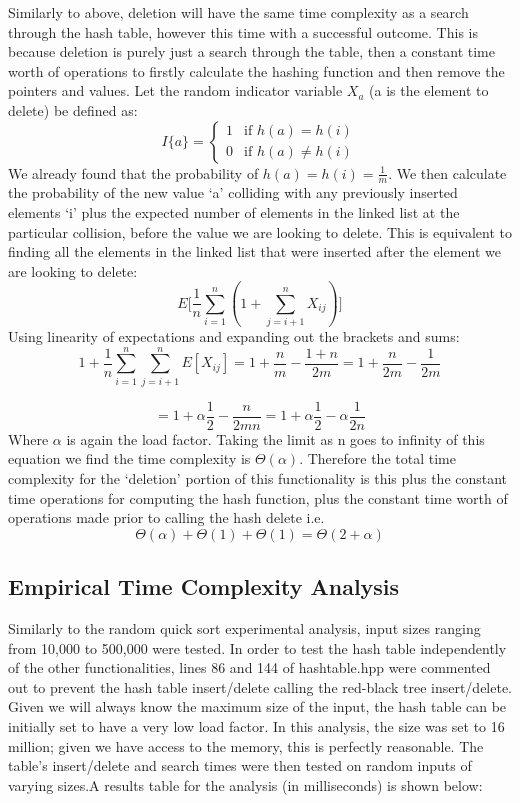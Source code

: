 \documentclass[11p]{article}
\def\nl{\newline}
\begin{document}
Similarly to above, deletion will have the same time complexity as a search through the hash table, however this time with a successful outcome. This is because deletion is purely just a search through the table, then a constant time worth of operations to firstly calculate the hashing function and then remove the pointers and values. \nl
Let the random indicator variable $X_a$ (a is the element to delete) be defined as:
\begin{equation*}
    I\{a \}=
    \begin{cases}
    1 & \text{if } h(a) = h(i) \\
    0 & \text{if } h(a) \ne h(i)
    \end{cases}
\end{equation*}
We already found that the probability of $h(a) = h(i) = \frac{1}{m}$. We then calculate the probability of the new value `a' colliding with any previously inserted elements `i' plus the expected number of elements in the linked list at the particular collision, before the value we are looking to delete. This is equivalent to finding all the elements in the linked list that were inserted after the element we are looking to delete: 
$$E\big[\frac{1}{n} \sum_{i=1}^n (1 + \sum_{j = i+1}^n X_{ij}) \big]$$
Using linearity of expectations and expanding out the brackets and sums:
$$ 1 + \frac{1}{n} \sum_{i=1}^n \sum_{j = i+1}^n E[X_{ij}] = 1 + \frac{n}{m} - \frac{1 + n}{2m} = 1 + \frac{n}{2m} - \frac{1}{2m}$$

$$ = 1 + \alpha \frac{1}{2} - \frac{n}{2mn} = 1 + \alpha \frac{1}{2} - \alpha \frac{1}{2n}$$
Where $\alpha$ is again the load factor. Taking the limit as n goes to infinity of this equation we find the time complexity is $\Theta({\alpha})$. Therefore the total time complexity for the `deletion' portion of this functionality is this plus the constant time operations for computing the hash function, plus the constant time worth of operations made prior to calling the hash delete i.e.
$$\Theta(\alpha) + \Theta(1) + \Theta(1)= \Theta(2 + \alpha)$$

\pagebreak

\subsection{Empirical Time Complexity Analysis}
Similarly to the random quick sort experimental analysis, input sizes ranging from 10,000 to 500,000 were tested. In order to test the hash table independently of the other functionalities, lines 86 and 144 of hashtable.hpp were commented out to prevent the hash table insert/delete calling the red-black tree insert/delete. Given we will always know the maximum size of the input, the hash table can be initially set to have a very low load factor. In this analysis, the size was set to 16 million; given we have access to the memory, this is perfectly reasonable. The table's insert/delete and search times were then tested on random inputs of varying sizes.A results table for the analysis (in milliseconds) is shown below:
\end{document}
